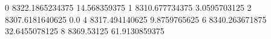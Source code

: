 0 8322.1865234375 14.568359375
1 8310.677734375 3.0595703125
2 8307.6181640625 0.0
4 8317.494140625 9.8759765625
6 8340.263671875 32.6455078125
8 8369.53125 61.9130859375

